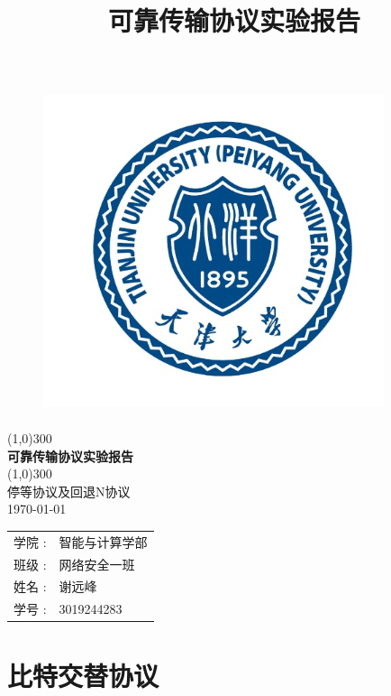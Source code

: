 \documentclass[UTF8,14pt]{article}
\title{可靠传输协议实验报告}
\numberwithin{figure}{section}
\begin{document}
\begin{titlepage}
      \begin{center}
            \begin{figure}[ht]
                  \centering
                  \includegraphics[width=10cm,height=9.5cm]{figures/封面.png}
            \end{figure}
            \line(1,0){300}\\
            [0.65cm]
            \Huge{\bfseries 可靠传输协议实验报告 }\\
            \line(1,0){300}\\
            \huge {停等协议及回退N协议\\
                  \today}\\
            [3.5cm]
            \LARGE{
                  \begin{tabular}{rl}
                        学院 :        & 智能与计算学部 \\
                        班级 :        & 网络安全一班   \\
                        姓名        : & 谢远峰         \\
                        学号       :  & 3019244283
                  \end{tabular}
            }
      \end{center}

\end{titlepage}
\clearpage

\section{比特交替协议}
\end{document}
